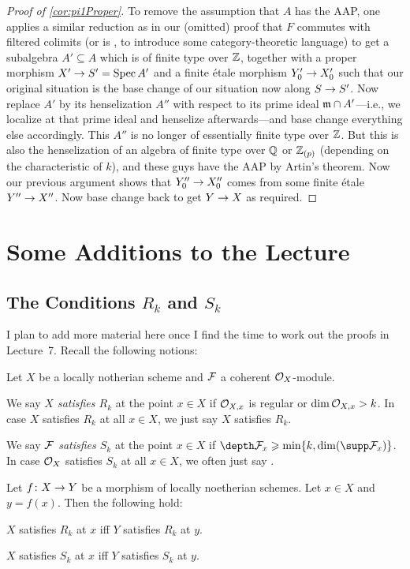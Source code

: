 \documentclass[a4paper, 10pt, oneside, DIV=9, chapterprefix=true, numbers=enddot, bibliography=totoc]{scrbook}
\begin{document}
\begin{proof}[Proof of \cref{cor:pi1Proper}]
	 To remove the assumption that $A$ has the AAP, one applies a similar reduction as in our (omitted) proof that $F$ commutes with filtered colimits (or is , to introduce some category-theoretic language) to get a subalgebra $A'\subseteq A$ which is of finite type over $\mathbb{Z}$, together with a proper morphism $X'\morphism S'=\Spec A'$ and a finite étale morphism $Y_0'\morphism X_0'$ such that our original situation is the base change of our situation now along $S\morphism S'$. Now replace $A'$ by its henselization $A''$ with respect to its prime ideal $\mathfrak{m}\cap A'$---i.e., we localize at that prime ideal and henselize afterwards---and base change everything else accordingly. This $A''$ is no longer of essentially finite type over $\mathbb{Z}$. But this is also the henselization of an algebra of finite type over $\mathbb{Q}$ or $\mathbb{Z}_{(p)}$ (depending on the characteristic of $k$), and these guys have the AAP by Artin's theorem. Now our previous argument shows that $Y_0''\morphism X_0''$ comes from some finite étale $Y''\morphism X''$. Now base change back to get $Y\morphism X$ as required.
\end{proof}


\appendix
\chapter{Some Additions to the Lecture}
\section{The Conditions \texorpdfstring{$R_k$}{Rk} and \texorpdfstring{$S_k$}{Sk}}
I plan to add more material here once I find the time to work out the proofs in Lecture~7. Recall the following notions:
\begin{defi}
	Let $X$ be a locally notherian scheme and $\mathcal{F}$ a coherent $\mathcal{O}_X$-module.
	\begin{alphanumerate}
		\item We say \emph{$X$ satisfies $R_k$} at the point $x\in X$ if $\mathcal{O}_{X,x}$ is regular or  $\dim\mathcal{O}_{X,x}> k$. In case $X$ satisfies $R_k$ at all $x\in X$, we just say $X$ satisfies $R_k$.
		\item We say \emph{$\mathcal{F}$ satisfies $S_k$} at the point $x\in X$ if $\depth \Ff_x\geq \min\{k,\dim(\supp \Ff_x)\}$. In case $\mathcal{O}_X$ satisfies $S_k$ at all $x\in X$, we often just say .
	\end{alphanumerate}
\end{defi}
\begin{lem}\label{lem:EtaleRkSk}
	Let $f\colon X\morphism Y$ be a morphism of locally noetherian schemes. Let $x\in X$ and $y=f(x)$. Then the following hold:
	\begin{alphanumerate}
		\item $X$ satisfies $R_k$ at $x$ iff $Y$ satisfies $R_k$ at $y$.
		\item $X$ satisfies $S_k$ at $x$ iff $Y$ satisfies $S_k$ at $y$.
	\end{alphanumerate}
\end{lem}

\backmatter{}
\printbibliography[prenote=LINKS]
\end{document}
